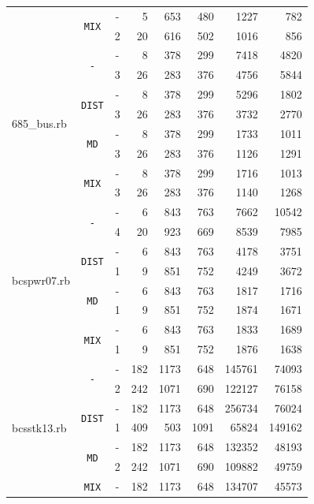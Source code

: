 \documentclass{ctuthesis}
\theoremstyle{plain}
\theoremstyle{definition}
\begin{document}
{\begin{tabular}{|l|c|c|r|r|r|r|r|}
	& \multirow{2}{*}{\texttt{MIX}}
  	& -	& 5	  & 653 & 480 &	1227	&	782 \\
	& & 2	&	20	&	616	&	502	&	1016	&	856	\\
\hline
\multirow{8}{*}{685\_bus.rb}
	& \multirow{2}{*}{\texttt{-}}
  	& -	&  8	& 378 & 299 & 7418	&	4820	\\
	& & 3	&	26	&	283	&	376	&	4756	&	5844	\\
	& \multirow{2}{*}{\texttt{DIST}}
  	& -	&  8	& 378 & 299 & 5296	&	1802	\\
	& & 3	&	26	&	283	&	376	&	3732	&	2770	\\
	& \multirow{2}{*}{\texttt{MD}}
  	& -	&  8	& 378 & 299 & 1733	&	1011	\\
	& & 3	&	26	&	283	&	376	&	1126	&	1291	\\
	& \multirow{2}{*}{\texttt{MIX}}
  	& -	&  8	& 378 & 299 & 1716	&	1013	\\
	& & 3	&	26	&	283	&	376	&	1140	&	1268	\\
\hline
\multirow{8}{*}{bcspwr07.rb}
	& \multirow{2}{*}{\texttt{-}}
  	& -	  & 6	& 843 & 763 & 7662	&	10542	\\
	& & 4	&	20	&	923	&	669	&	8539	&	7985	\\
	& \multirow{2}{*}{\texttt{DIST}}
  	& -	  & 6	& 843 & 763 & 4178	&	3751	\\
	& & 1 	&	9	&	851	&	752	&	4249	&	3672	\\
	& \multirow{2}{*}{\texttt{MD}}
  	& -	  & 6	& 843 & 763 & 1817	&	1716	\\
	& & 1 	&	9	&	851	&	752	&	1874	&	1671	\\
	& \multirow{2}{*}{\texttt{MIX}}
  	& -	  & 6	& 843 & 763 & 1833	&	1689	\\
	& & 1 	&	9	&	851	&	752	&	1876	&	1638	\\
\hline
\multirow{8}{*}{bcsstk13.rb}
	& \multirow{2}{*}{\texttt{-}}
  	& -	& 182	& 1173  & 648 & 145761	&	74093	\\
	& & 2	&	242	&	1071	&	690	&	122127	&	76158	\\
	& \multirow{2}{*}{\texttt{DIST}}
  	& -	& 182	& 1173  & 648  & 256734	&	76024	\\
	& & 1 &	409	&	503	  &	1091 &	65824	&	149162	\\
	& \multirow{2}{*}{\texttt{MD}}
  	& -	& 182	& 1173  & 648 & 132352	&	48193	\\
	& & 2	&	242	&	1071	&	690	&	109882	&	49759	\\
	& \multirow{2}{*}{\texttt{MIX}}
  	& -	& 182	& 1173  & 648  & 134707	&	45573	\\

\end{tabular}}
\end{document}
